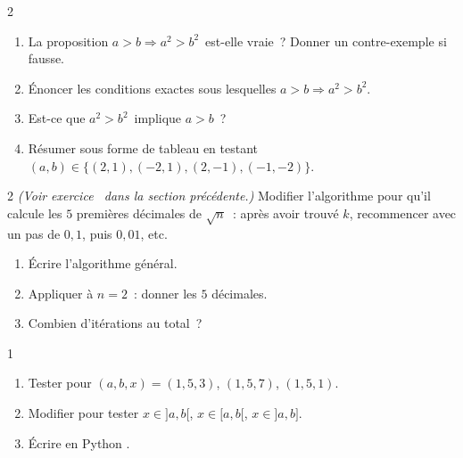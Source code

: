 \begin{bilan}
\begin{exo}{2}
\begin{enumerate}
  \item La proposition \og $a>b \Rightarrow a^2>b^2$\fg\ est-elle vraie~?
        Donner un contre-exemple si fausse.
  \item \'Enoncer les conditions exactes sous lesquelles $a>b\Rightarrow a^2>b^2$.
  \item Est-ce que \og $a^2>b^2$\fg\ implique \og $a>b$\fg~?
  \item R\'esumer sous forme de tableau en testant $(a,b)\in\{(2,1),(-2,1),(2,-1),(-1,-2)\}$.
\end{enumerate}
\end{exo}

\begin{exo}{2}
\emph{(Voir exercice \logicoalgo\ dans la section pr\'ec\'edente.)}
Modifier l'algorithme pour qu'il calcule les $5$ premi\`eres d\'ecimales
de $\sqrt{n}$~: apr\`es avoir trouv\'e $k$, recommencer avec un pas de $0{,}1$,
puis $0{,}01$, etc.
\begin{enumerate}
  \item \'Ecrire l'algorithme g\'en\'eral.
  \item Appliquer \`a $n=2$~: donner les $5$ d\'ecimales.
  \item Combien d'it\'erations au total~?
\end{enumerate}
\end{exo}

\begin{exo}{1}

\begin{algorithm}[H]
\caption{Test d'appartenance \`a $[a,b]$}
\Sinon{\Retourner \Faux\;}
\end{algorithm}

\begin{enumerate}
  \item Tester pour $(a,b,x)=(1,5,3)$, $(1,5,7)$, $(1,5,1)$.
  \item Modifier pour tester $x\in]a,b[$, $x\in[a,b[$, $x\in]a,b]$.
  \item \'Ecrire en Python \computer.
\end{enumerate}
\end{exo}


\end{bilan}
